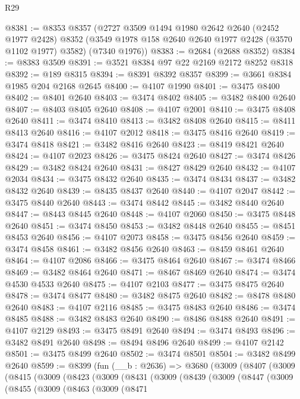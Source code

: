 \begin{lexlean}{R29}
\begin{coremodule}
@8381 := @8353
    @8357
    (@2727
      @3509
      @1494
      @1980
      @2642
      @2640
      (@2452 @1977 @2428)
      @8352
      (@3549 @1978 @158 @2640 @2640 @1977 @2428 (@3570 @1102 @1977) @3582)
      (@7340 @1976))
@8383 := @2684 (@2688 @8352)
@8384 := @8383 @3509
@8391 := @3521 @8384 @97 @22 @2169 @2172 @8252 @8318
@8392 := @189 @8315
@8394 := @8391 @8392 @8357
@8399 := @3661 @8384 @1985 @204 @2168 @2645
@8400 := @4107 @1990
@8401 := @3475 @8400
@8402 := @8401 @2640
@8403 := @3474 @8402
@8405 := @3482 @8400 @2640
@8407 := @8403 @8405 @2640
@8408 := @4107 @2001
@8410 := @3475 @8408 @2640
@8411 := @3474 @8410
@8413 := @3482 @8408 @2640
@8415 := @8411 @8413 @2640
@8416 := @4107 @2012
@8418 := @3475 @8416 @2640
@8419 := @3474 @8418
@8421 := @3482 @8416 @2640
@8423 := @8419 @8421 @2640
@8424 := @4107 @2023
@8426 := @3475 @8424 @2640
@8427 := @3474 @8426
@8429 := @3482 @8424 @2640
@8431 := @8427 @8429 @2640
@8432 := @4107 @2034
@8434 := @3475 @8432 @2640
@8435 := @3474 @8434
@8437 := @3482 @8432 @2640
@8439 := @8435 @8437 @2640
@8440 := @4107 @2047
@8442 := @3475 @8440 @2640
@8443 := @3474 @8442
@8445 := @3482 @8440 @2640
@8447 := @8443 @8445 @2640
@8448 := @4107 @2060
@8450 := @3475 @8448 @2640
@8451 := @3474 @8450
@8453 := @3482 @8448 @2640
@8455 := @8451 @8453 @2640
@8456 := @4107 @2073
@8458 := @3475 @8456 @2640
@8459 := @3474 @8458
@8461 := @3482 @8456 @2640
@8463 := @8459 @8461 @2640
@8464 := @4107 @2086
@8466 := @3475 @8464 @2640
@8467 := @3474 @8466
@8469 := @3482 @8464 @2640
@8471 := @8467 @8469 @2640
@8474 := @3474 @4530 @4533 @2640
@8475 := @4107 @2103
@8477 := @3475 @8475 @2640
@8478 := @3474 @8477
@8480 := @3482 @8475 @2640
@8482 := @8478 @8480 @2640
@8483 := @4107 @2116
@8485 := @3475 @8483 @2640
@8486 := @3474 @8485
@8488 := @3482 @8483 @2640
@8490 := @8486 @8488 @2640
@8491 := @4107 @2129
@8493 := @3475 @8491 @2640
@8494 := @3474 @8493
@8496 := @3482 @8491 @2640
@8498 := @8494 @8496 @2640
@8499 := @4107 @2142
@8501 := @3475 @8499 @2640
@8502 := @3474 @8501
@8504 := @3482 @8499 @2640
@8599 := @8399
    (fun (__b : @2636) =>
    @3680
      (@3009
        (@8407
          (@3009
            (@8415
              (@3009
                (@8423
                  (@3009
                    (@8431
                      (@3009
                        (@8439
                          (@3009
                            (@8447
                              (@3009
                                (@8455
                                  (@3009
                                    (@8463
                                      (@3009
                                        (@8471

\end{coremodule}
\end{lexlean}
